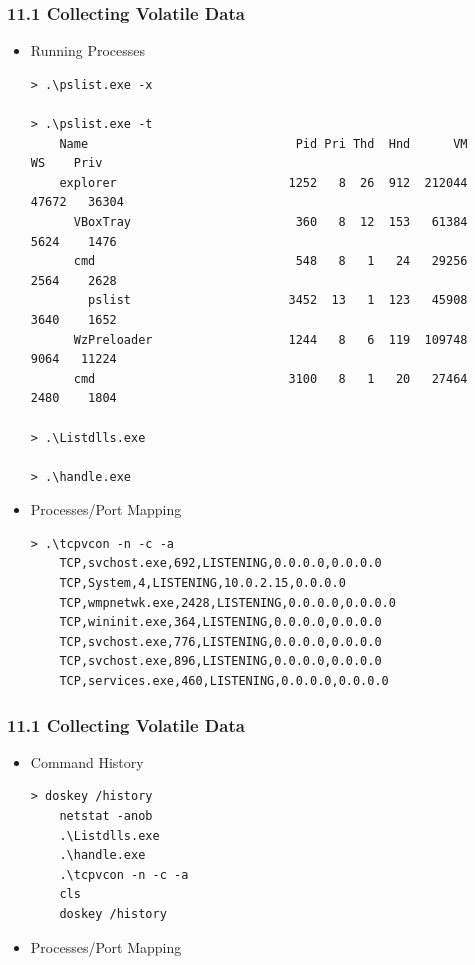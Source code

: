 \begin{frame}[fragile]
  \frametitle{11.1 Collecting Volatile Data}
  \begin{itemize}
        \item Running Processes
\begin{lstlisting}[basicstyle=\tiny]
> .\pslist.exe -x

> .\pslist.exe -t
    Name                             Pid Pri Thd  Hnd      VM      WS    Priv
    explorer                        1252   8  26  912  212044   47672   36304
      VBoxTray                       360   8  12  153   61384    5624    1476
      cmd                            548   8   1   24   29256    2564    2628
        pslist                      3452  13   1  123   45908    3640    1652
      WzPreloader                   1244   8   6  119  109748    9064   11224
      cmd                           3100   8   1   20   27464    2480    1804

> .\Listdlls.exe

> .\handle.exe
\end{lstlisting}
        \item Processes/Port Mapping
\begin{lstlisting}[basicstyle=\tiny]
> .\tcpvcon -n -c -a
    TCP,svchost.exe,692,LISTENING,0.0.0.0,0.0.0.0
    TCP,System,4,LISTENING,10.0.2.15,0.0.0.0
    TCP,wmpnetwk.exe,2428,LISTENING,0.0.0.0,0.0.0.0
    TCP,wininit.exe,364,LISTENING,0.0.0.0,0.0.0.0
    TCP,svchost.exe,776,LISTENING,0.0.0.0,0.0.0.0
    TCP,svchost.exe,896,LISTENING,0.0.0.0,0.0.0.0
    TCP,services.exe,460,LISTENING,0.0.0.0,0.0.0.0
\end{lstlisting}
    \end{itemize}
\end{frame}


\begin{frame}[fragile]
  \frametitle{11.1 Collecting Volatile Data}
  \begin{itemize}
        \item Command History
\begin{lstlisting}[basicstyle=\tiny]
> doskey /history
    netstat -anob
    .\Listdlls.exe
    .\handle.exe
    .\tcpvcon -n -c -a
    cls
    doskey /history
\end{lstlisting}
        \item Processes/Port Mapping
\begin{lstlisting}[basicstyle=\tiny]

\end{lstlisting}
    \end{itemize}
\end{frame}


